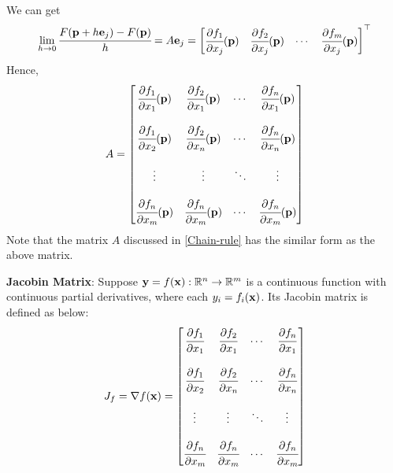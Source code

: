     We can get
    \begin{equation}
        \lim_{h\to 0} \cfrac{F(\mathbf{p} + h\mathbf{e}_j) - F(\mathbf{p}) }{h} = A\mathbf{e}_j = \begin{bmatrix}
            \cfrac{\partial f_1}{\partial x_j}(\mathbf{p}) & \cfrac{\partial f_2}{\partial x_j}(\mathbf{p}) & \cdots & \cfrac{\partial f_m}{\partial x_j}(\mathbf{p})
        \end{bmatrix}^{\top}
    \end{equation}
    Hence,
    \begin{equation}
        A = \begin{bmatrix}
            \cfrac{\partial f_1}{\partial x_1}(\mathbf{p}) & \cfrac{\partial f_2}{\partial x_1}(\mathbf{p}) & \cdots & \cfrac{\partial f_n}{\partial x_1}(\mathbf{p})\\\\

            \cfrac{\partial f_1}{\partial x_2}(\mathbf{p}) & \cfrac{\partial f_2}{\partial x_n}(\mathbf{p}) & \cdots & \cfrac{\partial f_n}{\partial x_n}(\mathbf{p})\\\\

            \vdots & \vdots & \ddots & \vdots\\\\

             \cfrac{\partial f_n}{\partial x_m}(\mathbf{p}) & \cfrac{\partial f_n}{\partial x_m}(\mathbf{p}) & \cdots & \cfrac{\partial f_n}{\partial x_m}(\mathbf{p})
             \end{bmatrix}
    \end{equation}
    Note that the matrix $A$ discussed in \cref{Chain-rule} has the similar form as the above matrix.
    \begin{Def}\label{Jacobin-Matrix}
        \textbf{Jacobin Matrix}:
    Suppose $\mathbf{y} = f(\mathbf{x}):\mathbb{R}^n \to \mathbb{R}^m$ is a continuous function with continuous partial derivatives, where each $y_i = f_i(\mathbf{x})$. Its Jacobin matrix is defined as below:
    \begin{equation}
        J_f = \nabla f(\mathbf{x})= \begin{bmatrix}
            \cfrac{\partial f_1}{\partial x_1} & \cfrac{\partial f_2}{\partial x_1} & \cdots & \cfrac{\partial f_n}{\partial x_1}\\\\

            \cfrac{\partial f_1}{\partial x_2} & \cfrac{\partial f_2}{\partial x_n} & \cdots & \cfrac{\partial f_n}{\partial x_n}\\\\

            \vdots & \vdots & \ddots & \vdots\\\\

             \cfrac{\partial f_n}{\partial x_m} & \cfrac{\partial f_n}{\partial x_m} & \cdots & \cfrac{\partial f_n}{\partial x_m}
        \end{bmatrix}
    \end{equation}
    \end{Def}    
